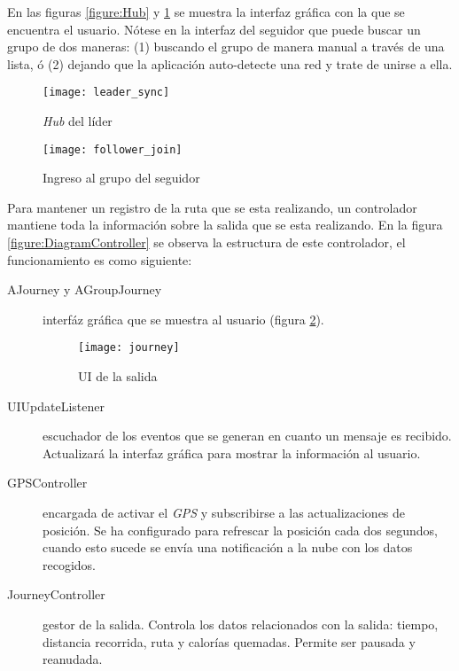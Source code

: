 En las figuras \ref{figure:Hub} y \ref{figure:FollowerJoin} se muestra la interfaz gráfica con la que se encuentra el usuario. Nótese en la interfaz del seguidor que puede buscar un grupo de dos maneras: (1) buscando el grupo de manera manual a través de una lista, ó (2) dejando que la aplicación auto-detecte una red y trate de unirse a ella.			

\begin{figure}[h]
	\begin{minipage}{.5\textwidth}
		\begin{center}
			\texttt{[image: leader\_sync]}
			\caption{\emph{Hub} del líder}
			\label{figure:Hub}
		\end{center}
	\end{minipage}
\begin{minipage}{.5\textwidth}
	\begin{center}
		\texttt{[image: follower\_join]}
		\caption{Ingreso al grupo del seguidor}
		\label{figure:FollowerJoin}
	\end{center}
\end{minipage}
\end{figure}
		
Para mantener un registro de la ruta que se esta realizando, un controlador mantiene toda la información sobre la salida que se esta realizando. En la figura \ref{figure:DiagramController} se observa la estructura de este controlador, el funcionamiento es como siguiente:
\begin{description}
	\item[AJourney y AGroupJourney] interfáz gráfica que se muestra al usuario (figura \ref{figure:Journey}).
	\begin{figure}[h]
		\begin{center}
			\texttt{[image: journey]}
			\caption{UI de la salida}
			\label{figure:Journey}
		\end{center}
	\end{figure}			
	\item[UIUpdateListener] escuchador de los eventos que se generan en cuanto un mensaje es recibido. Actualizará la interfaz gráfica para mostrar la información al usuario.
	\item[GPSController] encargada de activar el \emph{GPS} y subscribirse a las actualizaciones de posición. Se ha configurado para refrescar la posición cada dos segundos, cuando esto sucede se envía una notificación a la nube con los datos recogidos.
	\item[JourneyController] gestor de la salida. Controla los datos relacionados con la salida: tiempo, distancia recorrida, ruta y calorías quemadas. Permite ser pausada y reanudada.
\end{description}
		
